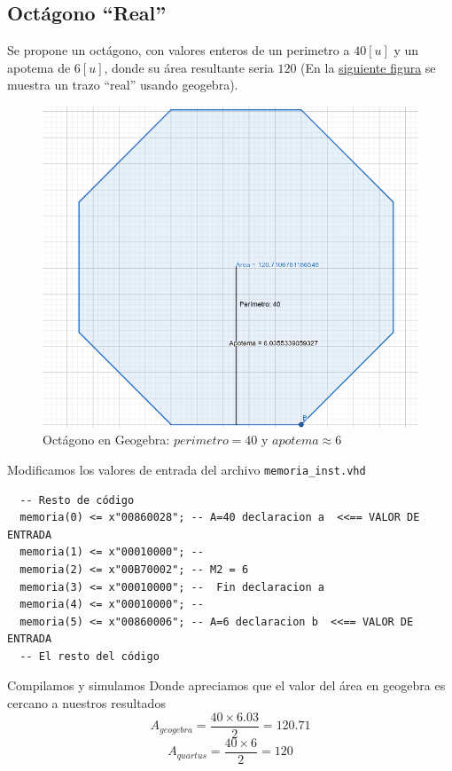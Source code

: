 \documentclass{IEEEtran}
\begin{document}
\subsection{Octágono ``Real''}
\label{sec:org24043b1}
Se propone un octágono, con valores enteros de un perimetro a \(40[u]\) y un apotema de \(6[u]\),  donde su área resultante seria \(120\) (En la \hyperref[fig:geo51x7]{siguiente figura} se muestra un trazo ``real'' usando geogebra).
\begin{figure}[htbp]
\centering
\includegraphics[width=.9\linewidth]{./img/geo40x6.png}
\caption{\label{fig:geo51x7}Octágono en Geogebra: \(perimetro = 40\) y \(apotema \approx 6\)}
\end{figure}
Modificamos los valores de entrada del archivo \texttt{memoria\_inst.vhd}
\begin{verbatim}
  -- Resto de código
  memoria(0) <= x"00860028"; -- A=40 declaracion a  <<== VALOR DE ENTRADA
  memoria(1) <= x"00010000"; --
  memoria(2) <= x"00B70002"; -- M2 = 6
  memoria(3) <= x"00010000"; --  Fin declaracion a
  memoria(4) <= x"00010000"; --
  memoria(5) <= x"00860006"; -- A=6 declaracion b  <<== VALOR DE ENTRADA
  -- El resto del código
\end{verbatim}
Compilamos y simulamos
Donde apreciamos que el valor del área en geogebra es cercano a nuestros resultados
\[ A_{geogebra} = \frac{40 \times 6.03}{2} = 120.71 \]
\[ A_{quartus} = \frac{40 \times 6}{2} = 120 \]
\end{document}
